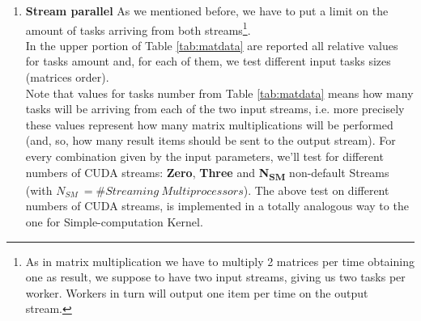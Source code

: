\begin{enumerate}
	
	
	
	\item \textbf{Stream parallel}
	As we mentioned before, we have to put a limit on the amount of tasks arriving from both streams\footnote{As in matrix multiplication we have to multiply 2 matrices per time obtaining one as result, we suppose to have two input streams, giving us two tasks per worker. Workers in turn will output one item per time on the output stream.}.\\
	In the upper portion of Table \ref{tab:matdata} are reported all relative values for tasks amount and, for each of them, we test different input tasks sizes (matrices order).\\
	Note that values for tasks number from Table \ref{tab:matdata} means how many tasks will be arriving from each of the two input streams, i.e. more precisely these values represent how many matrix multiplications will be performed (and, so, how many result items should be sent to the output stream).
	For every combination given by the input parameters, we'll test for different numbers of CUDA streams: \textbf{Zero}, \textbf{Three} and \textbf{N\textsubscript{SM}} non-default Streams (with \(N_{SM} \ =\# Streaming \ Multiprocessors\)).
	The above test on different numbers of CUDA streams, is implemented in a totally analogous way to the one for Simple-computation Kernel.
\end{enumerate}


